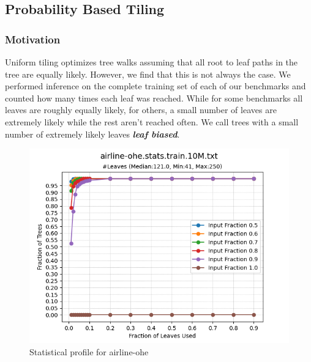 \subsection{Probability Based Tiling}
\label{sec:ProbTiling}
\subsubsection{Motivation}
Uniform tiling optimizes tree walks assuming that all root to leaf paths in the tree are equally likely. 
However, we find that this is not always the case. We performed inference on the complete training set of each of our benchmarks and counted how many
times each leaf was reached. While for some benchmarks all leaves are roughly equally likely, for others, a small number of leaves are extremely likely 
while the rest aren't reached often. We call trees with a small number of extremely likely leaves \textbf{\emph{leaf biased}}.
\begin{figure}
    \centering
    \includegraphics[width=\linewidth]{figures/airline-ohe.stats.train.txt.png}
    \caption{Statistical profile for airline-ohe}
    \label{Fig:AirlineOHEStats}
\end{figure}
